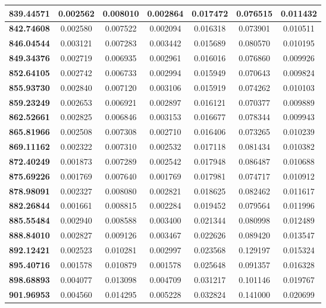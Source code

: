 \documentclass[10pt, a4paper]{article}
\begin{document}
\begin{appendices}
\begin{longtable}{|c|c|c|c|c|c|c|}
\textbf{839.44571} & 0.002562 & 0.008010 & 0.002864 & 0.017472 & 0.076515 & 0.011432 \\ \hline
\textbf{842.74608} & 0.002580 & 0.007522 & 0.002094 & 0.016318 & 0.073901 & 0.010511 \\ \hline
\textbf{846.04544} & 0.003121 & 0.007283 & 0.003442 & 0.015689 & 0.080570 & 0.010195 \\ \hline
\textbf{849.34376} & 0.002719 & 0.006935 & 0.002961 & 0.016016 & 0.076860 & 0.009926 \\ \hline
\textbf{852.64105} & 0.002742 & 0.006733 & 0.002994 & 0.015949 & 0.070643 & 0.009824 \\ \hline
\textbf{855.93730} & 0.002840 & 0.007120 & 0.003106 & 0.015919 & 0.074262 & 0.010103 \\ \hline
\textbf{859.23249} & 0.002653 & 0.006921 & 0.002897 & 0.016121 & 0.070377 & 0.009889 \\ \hline
\textbf{862.52661} & 0.002825 & 0.006846 & 0.003153 & 0.016677 & 0.078344 & 0.009943 \\ \hline
\textbf{865.81966} & 0.002508 & 0.007308 & 0.002710 & 0.016406 & 0.073265 & 0.010239 \\ \hline
\textbf{869.11162} & 0.002322 & 0.007310 & 0.002532 & 0.017118 & 0.081434 & 0.010382 \\ \hline
\textbf{872.40249} & 0.001873 & 0.007289 & 0.002542 & 0.017948 & 0.086487 & 0.010688 \\ \hline
\textbf{875.69226} & 0.001769 & 0.007640 & 0.001769 & 0.017981 & 0.074717 & 0.010912 \\ \hline
\textbf{878.98091} & 0.002327 & 0.008080 & 0.002821 & 0.018625 & 0.082462 & 0.011617 \\ \hline
\textbf{882.26844} & 0.001661 & 0.008815 & 0.002284 & 0.019452 & 0.079564 & 0.011996 \\ \hline
\textbf{885.55484} & 0.002940 & 0.008588 & 0.003400 & 0.021344 & 0.080998 & 0.012489 \\ \hline
\textbf{888.84010} & 0.002827 & 0.009126 & 0.003467 & 0.022626 & 0.089420 & 0.013547 \\ \hline
\textbf{892.12421} & 0.002523 & 0.010281 & 0.002997 & 0.023568 & 0.129197 & 0.015324 \\ \hline
\textbf{895.40716} & 0.001578 & 0.010879 & 0.001578 & 0.025648 & 0.091357 & 0.016328 \\ \hline
\textbf{898.68893} & 0.004077 & 0.013098 & 0.004709 & 0.031217 & 0.101146 & 0.019767 \\ \hline
\textbf{901.96953} & 0.004560 & 0.014295 & 0.005228 & 0.032824 & 0.141000 & 0.020699 \\ \hline

\end{longtable}
\end{appendices}
\end{document}
